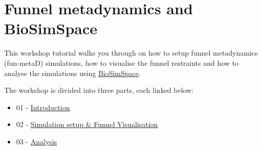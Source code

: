 \hypertarget{funnel-metadynamics-and-biosimspace}{%
\section{Funnel metadynamics and
BioSimSpace}\label{funnel-metadynamics-and-biosimspace}}

This workshop tutorial walks you through on how to setup funnel
metadynamics (fun-metaD) simulations, how to visualise the funnel
restraints and how to analyse the simulations using
\href{https://biosimspace.org/index.html}{BioSimSpace}.

The workshop is divided into three parts, each linked below:

\begin{itemize}
\tightlist
\item
  01 - \href{01_Introduction.md}{Introduction}
\item
  02 - \href{02_bss-fun-metad-tutorial.ipynb}{Simulation setup \& Funnel
  Visualisation}
\item
  03 - \href{03_bss-fun-metad-analysis.ipynb}{Analysis}
\end{itemize}
